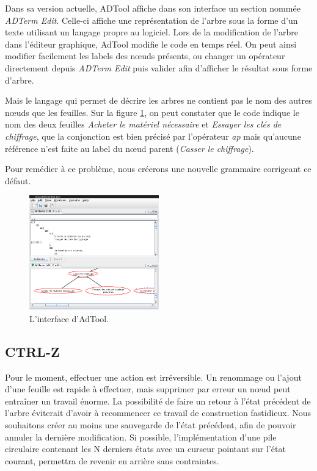 	Dans sa version actuelle, ADTool affiche dans son interface un section nommée \emph{ADTerm Edit}. Celle-ci affiche une représentation de l'arbre sous la forme d'un texte utilisant un langage propre au logiciel. Lors de la modification de l'arbre dans l'éditeur graphique, AdTool modifie le code en temps réel. On peut ainsi modifier facilement les labels des nœuds présents, ou changer un opérateur directement depuis \emph{ADTerm Edit} puis valider afin d'afficher le résultat sous forme d'arbre. 

	Mais le langage qui permet de décrire les arbres ne contient pas le nom des autres nœuds que les feuilles. Sur la figure \ref{fig:int_adTool}, on peut constater que le code indique le nom des deux feuilles \textit{Acheter le matériel nécessaire} et \textit{Essayer les clés de chiffrage}, que la conjonction est bien précisé par l'opérateur \textit{ap} mais qu'aucune référence n'est faite au label du nœud parent (\textit{Casser le chiffrage}).

	Pour remédier à ce problème, nous créerons une nouvelle grammaire corrigeant ce défaut.



	\begin{figure}
		\centering
		\includegraphics[width=0.5\textwidth]{figure/interface_adtool.png}
		\caption{L'interface d'AdTool.}
		\label{fig:int_adTool}
	\end{figure}
	
	\subsection{CTRL-Z}
	Pour le moment, effectuer une action est irréversible. Un renommage ou l'ajout d'une feuille est rapide à effectuer, mais supprimer par erreur un nœud peut entraîner un travail énorme. La possibilité de faire un retour à l'état précédent de l'arbre éviterait d'avoir à recommencer ce travail de construction fastidieux. Nous souhaitons créer au moins une sauvegarde de l'état précédent, afin de pouvoir annuler la dernière modification. Si possible, l'implémentation d'une pile circulaire contenant les N derniers états avec un curseur pointant sur l'état courant, permettra de revenir en arrière sans contraintes.
	
